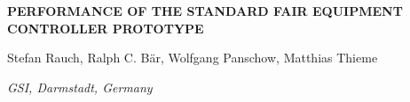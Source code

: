 \documentclass[25pt,halfparskip-,pagesize]{scrartcl}
\begin{document}
\vspace*{1ex}

{\centering
\begin{minipage}{20in}
\centering \sffamily\Huge \rule{0pt}{50pt}\textbf{PERFORMANCE OF THE STANDARD FAIR EQUIPMENT CONTROLLER PROTOTYPE}\par
\vspace{5mm} \LARGE Stefan Rauch, Ralph C. B\"ar, Wolfgang Panschow, Matthias Thieme
\par
\vspace{5mm}
\Large\itshape GSI, Darmstadt, Germany
\rule[-12pt]{0pt}{10pt}\par
\end{minipage}%
\par}%

\vspace{11cm}
\setlength{\fboxrule}{1pt}
\end{document}

